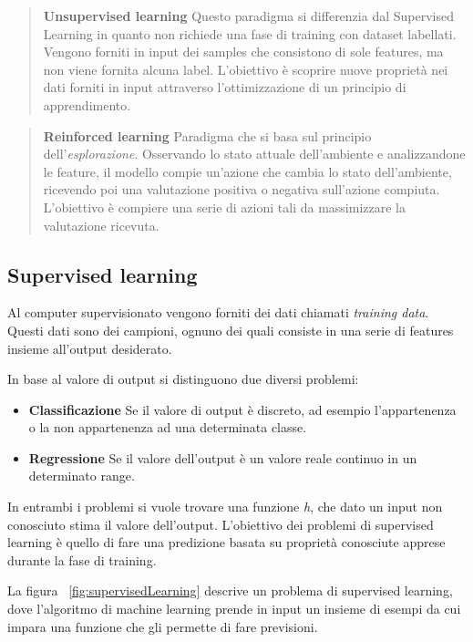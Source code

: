 \documentclass[../main.tex]{subfiles}
\begin{document}
\begin{verse}
				\textbf{Unsupervised learning} Questo paradigma si differenzia dal Supervised Learning in quanto non richiede una fase di training con dataset labellati. Vengono forniti in input dei samples che consistono di sole features, ma non viene fornita alcuna label. L'obiettivo è scoprire nuove proprietà nei dati forniti in input attraverso l'ottimizzazione di un principio di apprendimento.
\end{verse}

\begin{verse}
				\textbf{Reinforced learning} Paradigma che si basa sul principio dell'\textit{esplorazione}. Osservando lo stato attuale dell'ambiente e analizzandone le feature, il modello compie un'azione che cambia lo stato dell'ambiente, ricevendo poi una valutazione positiva o negativa sull'azione compiuta. L'obiettivo è compiere una serie di azioni tali da massimizzare la valutazione ricevuta.
\end{verse}

\subsection{Supervised learning}
Al computer supervisionato vengono forniti dei dati chiamati \textit{training data}. Questi dati sono dei campioni, ognuno dei quali consiste in una serie di features insieme all'output desiderato.

In base al valore di output si distinguono due diversi problemi:

\begin{itemize}
				\item \textbf{Classificazione} Se il valore di output è discreto, ad esempio l'appartenenza o la non appartenenza ad una determinata classe.
				\item \textbf{Regressione} Se il valore dell'output è un valore reale continuo in un determinato range.
\end{itemize}

In entrambi i problemi si vuole trovare una funzione \textit{h}, che dato un input non conosciuto stima il valore dell'output. L'obiettivo dei problemi di supervised learning è quello di fare una predizione basata su proprietà conosciute apprese durante la fase di training.

La figura ~\ref{fig:supervisedLearning} descrive un problema di supervised learning, dove l'algoritmo di machine learning prende in input un insieme di esempi da cui impara una funzione che gli permette di fare previsioni.
\end{document}
